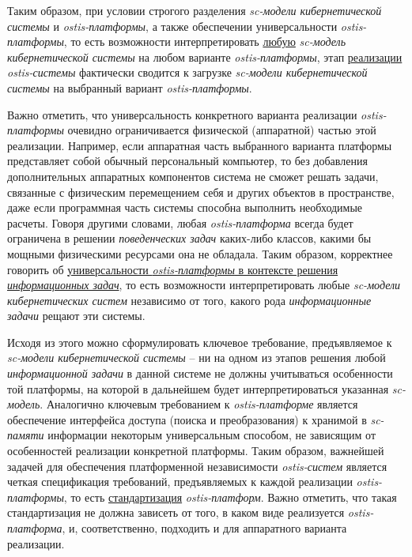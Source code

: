 Таким образом, при условии строгого разделения \textit{sc-модели кибернетической системы} и \textit{ostis-платформы}, а также обеспечении универсальности \textit{ostis-платформы}, то есть возможности интерпретировать \uline{любую} \textit{sc-модель кибернетической системы} на любом варианте \textit{ostis-платформы}, этап \uline{реализации} \textit{ostis-системы} фактически сводится к загрузке \textit{sc-модели кибернетической системы} на выбранный вариант \textit{ostis-платформы}.

Важно отметить, что универсальность конкретного варианта реализации \textit{ostis-платформы} очевидно ограничивается физической (аппаратной) частью этой реализации. Например, если аппаратная часть выбранного варианта платформы представляет собой обычный персональный компьютер, то без добавления дополнительных аппаратных компонентов система не сможет решать задачи, связанные с физическим перемещением себя и других объектов в пространстве, даже если программная часть системы способна выполнить необходимые расчеты. Говоря другими словами, любая \textit{ostis-платформа} всегда будет ограничена в решении \textit{поведенческих задач} каких-либо классов, какими бы мощными физическими ресурсами она не обладала. Таким образом, корректнее говорить об \uline{универсальности \textit{ostis-платформы} в контексте решения \textit{информационных задач}}, то есть возможности интерпретировать любые \textit{sc-модели кибернетических систем} независимо от того, какого рода \textit{информационные задачи} рещают эти системы. 

Исходя из этого можно сформулировать ключевое требование, предъявляемое к \textit{sc-модели кибернетической системы} -- ни на одном из этапов решения любой \textit{информационной задачи} в данной системе не должны учитываться особенности той платформы, на которой в дальнейшем будет интерпретироваться указанная \textit{sc-модель}. Аналогично ключевым требованием к \textit{ostis-платформе} является обеспечение интерфейса доступа (поиска и преобразования) к хранимой в \textit{sc-памяти} информации некоторым универсальным способом, не зависящим от особенностей реализации конкретной платформы. Таким образом, важнейшей задачей для обеспечения платформенной независимости \textit{ostis-систем} является четкая спецификация требований, предъявляемых к каждой реализации \textit{ostis-платформы}, то есть \uline{стандартизация} \textit{ostis-платформ}. Важно отметить, что такая стандартизация не должна зависеть от того, в каком виде реализуется \textit{ostis-платформа}, и, соответственно, подходить и для аппаратного варианта реализации.

